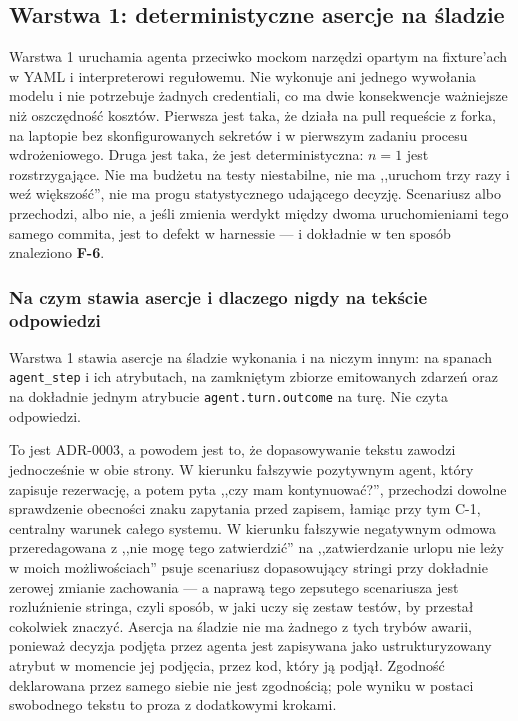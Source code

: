 \documentclass[11pt,a4paper]{article}
\newcommand{\finding}[1]{{\color{primaryblue}\textbf{#1}}}
\begin{document}
\subsection{Warstwa 1: deterministyczne asercje na śladzie}

Warstwa 1 uruchamia agenta przeciwko mockom narzędzi opartym na fixture'ach w YAML i interpreterowi regułowemu. Nie wykonuje ani jednego wywołania modelu i nie potrzebuje żadnych credentiali, co ma dwie konsekwencje ważniejsze niż oszczędność kosztów. Pierwsza jest taka, że działa na pull requeście z forka, na laptopie bez skonfigurowanych sekretów i w pierwszym zadaniu procesu wdrożeniowego. Druga jest taka, że jest deterministyczna: $n=1$ jest rozstrzygające. Nie ma budżetu na testy niestabilne, nie ma ,,uruchom trzy razy i weź większość'', nie ma progu statystycznego udającego decyzję. Scenariusz albo przechodzi, albo nie, a jeśli zmienia werdykt między dwoma uruchomieniami tego samego commita, jest to defekt w harnessie --- i dokładnie w ten sposób znaleziono \finding{F-6}.

\subsubsection*{Na czym stawia asercje i dlaczego nigdy na tekście odpowiedzi}

Warstwa 1 stawia asercje na śladzie wykonania i na niczym innym: na spanach \texttt{agent\_step} i ich atrybutach, na zamkniętym zbiorze emitowanych zdarzeń oraz na dokładnie jednym atrybucie \texttt{agent.turn.outcome} na turę. Nie czyta odpowiedzi.

To jest ADR-0003, a powodem jest to, że dopasowywanie tekstu zawodzi jednocześnie w obie strony. W kierunku fałszywie pozytywnym agent, który zapisuje rezerwację, a potem pyta ,,czy mam kontynuować?'', przechodzi dowolne sprawdzenie obecności znaku zapytania przed zapisem, łamiąc przy tym C-1, centralny warunek całego systemu. W kierunku fałszywie negatywnym odmowa przeredagowana z ,,nie mogę tego zatwierdzić'' na ,,zatwierdzanie urlopu nie leży w moich możliwościach'' psuje scenariusz dopasowujący stringi przy dokładnie zerowej zmianie zachowania --- a naprawą tego zepsutego scenariusza jest rozluźnienie stringa, czyli sposób, w jaki uczy się zestaw testów, by przestał cokolwiek znaczyć. Asercja na śladzie nie ma żadnego z tych trybów awarii, ponieważ decyzja podjęta przez agenta jest zapisywana jako ustrukturyzowany atrybut w momencie jej podjęcia, przez kod, który ją podjął. Zgodność deklarowana przez samego siebie nie jest zgodnością; pole wyniku w postaci swobodnego tekstu to proza z dodatkowymi krokami.
\end{document}
